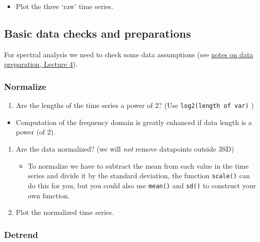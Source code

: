 \documentclass[]{book}
\providecommand{\tightlist}{%
  \setlength{\itemsep}{0pt}\setlength{\parskip}{0pt}}
\begin{document}
\begin{itemize}
\tightlist
\item
  Plot the three `raw' time series.
\end{itemize}

\subsection{Basic data checks and
preparations}\label{basic-data-checks-and-preparations}

For spectral analysis we need to check some data assumptions (see
\protect\hyperlink{data-considerations}{notes on data preparation,
Lecture 4}).

\subsubsection*{Normalize}\label{normalize}

\begin{enumerate}
\def\labelenumi{\arabic{enumi}.}
\tightlist
\item
  Are the lengths of the time series a power of 2? (Use
  \texttt{log2(length\ of\ var)} )
\end{enumerate}

\begin{itemize}
\tightlist
\item
  Computation of the frequency domain is greatly enhanced if data length
  is a power (of 2).
\end{itemize}

\begin{enumerate}
\def\labelenumi{\arabic{enumi}.}
\setcounter{enumi}{1}
\tightlist
\item
  Are the data normalized? (we will \emph{not} remove datapoints outside
  3SD)

  \begin{itemize}
  \tightlist
  \item
    To normalize we have to subtract the mean from each value in the
    time series and divide it by the standard deviation, the function
    \texttt{scale()} can do this for you, but you could also use
    \texttt{mean()} and \texttt{sd()} to construct your own function.
  \end{itemize}
\item
  Plot the normalized time series.
\end{enumerate}

\subsubsection*{Detrend}\label{detrend}
\end{document}
